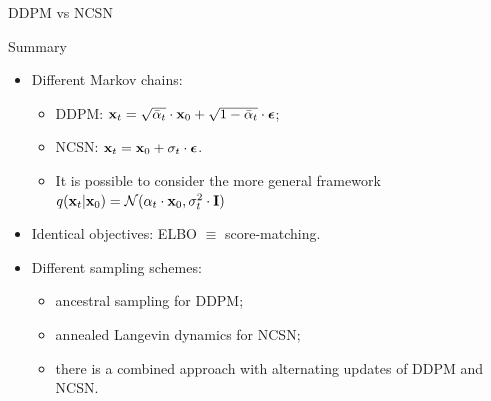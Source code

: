 \begin{frame}{DDPM vs NCSN}
	\begin{block}{Summary}
		\begin{itemize}
		\item Different Markov chains:
			\begin{itemize}
				\item DDPM: $\mathbf{x}_t = \sqrt{\bar{\alpha}_t} \cdot \mathbf{x}_0 + \sqrt{1 - \bar{\alpha}_t} \cdot \boldsymbol{\epsilon}$;
				\item NCSN: $\mathbf{x}_t = \mathbf{x}_0 + \sigma_t \cdot \boldsymbol{\epsilon}$.
				\item It is possible to consider the more general framework $q(\mathbf{x}_t |\mathbf{x}_0) = \mathcal{N}(\alpha_t \cdot \mathbf{x}_0, \sigma^2_t\cdot \mathbf{I})$
			\end{itemize}
		\item Identical objectives: ELBO $\equiv$ score-matching.
		\item Different sampling schemes:
			\begin{itemize}
				\item ancestral sampling for DDPM;
				\item annealed Langevin dynamics for NCSN;
				\item there is a combined approach with alternating updates of DDPM and NCSN.
			\end{itemize}
		\end{itemize}
	\end{block}
	\end{frame}
